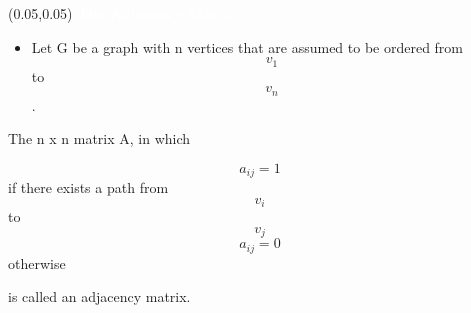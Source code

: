 \documentclass[aspectratio=169]{beamer} %
\begin{document}
\begin{frame}
    \setlength{\TPHorizModule}{\textwidth}
    \setlength{\TPVertModule}{\textwidth}
    \begin{textblock}{0.74}(0.05,0.05)
        \bfseries\large\textcolor{white}{The Adjacency Matrix}
    \end{textblock}

    \begin{itemize}
    \item Let G be a graph with n vertices that are assumed to be ordered from \[ v_1\] to \[ v_n \].
    \end{itemize}
    The n x n matrix A, in which

    \[ a_{ij} = 1 \] if there exists a path from \[ v_i \] to \[v_j \]
    \[ a_{ij} = 0 \] otherwise

    is called an adjacency matrix.
\end{frame}

%
%
\end{document}
